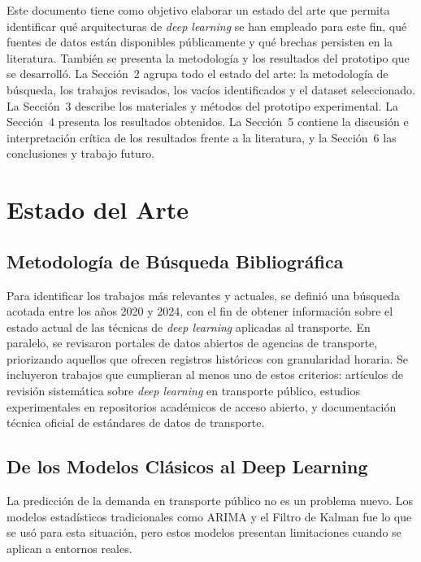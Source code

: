 \documentclass[preprint,12pt]{elsarticle}
\begin{document}
Este documento tiene como objetivo elaborar un estado del arte que permita identificar qué arquitecturas de \textit{deep learning} se han empleado para este fin, qué fuentes de datos están disponibles públicamente y qué brechas persisten en la literatura. También se presenta la metodología y los resultados del prototipo que se desarrolló. La Sección~2 agrupa todo el estado del arte: la metodología de búsqueda, los trabajos revisados, los vacíos identificados y el dataset seleccionado. La Sección~3 describe los materiales y métodos del prototipo experimental. La Sección~4 presenta los resultados obtenidos. La Sección~5 contiene la discusión e interpretación crítica de los resultados frente a la literatura, y la Sección~6 las conclusiones y trabajo futuro.


\section{Estado del Arte}

\subsection{Metodología de Búsqueda Bibliográfica}

Para identificar los trabajos más relevantes y actuales, se definió una búsqueda acotada entre los años 2020 y 2024, con el fin de obtener información sobre el estado actual de las técnicas de \textit{deep learning} aplicadas al transporte. En paralelo, se revisaron portales de datos abiertos de agencias de transporte, priorizando aquellos que ofrecen registros históricos con granularidad horaria. Se incluyeron trabajos que cumplieran al menos uno de estos criterios: artículos de revisión sistemática sobre \textit{deep learning} en transporte público, estudios experimentales en repositorios académicos de acceso abierto, y documentación técnica oficial de estándares de datos de transporte.

\subsection{De los Modelos Clásicos al Deep Learning}

La predicción de la demanda en transporte público no es un problema nuevo. Los modelos estadísticos tradicionales como ARIMA y el Filtro de Kalman fue lo que se usó para esta situación, pero estos modelos presentan limitaciones cuando se aplican a entornos reales.
\end{document}
